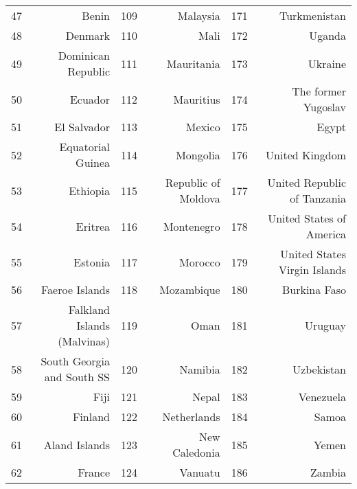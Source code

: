 \begin{table}[ht]
\begin{tabular}{r|r|r|r|r|r|}
47 & Benin & 109 & Malaysia & 171 & Turkmenistan \\ 
48 & Denmark & 110 & Mali & 172 & Uganda \\ 
49 & Dominican Republic & 111 & Mauritania & 173 & Ukraine \\ 
50 & Ecuador & 112 & Mauritius & 174 & The former Yugoslav \\ 
51 & El Salvador & 113 & Mexico & 175 & Egypt \\ 
52 & Equatorial Guinea & 114 & Mongolia & 176 & United Kingdom \\ 
53 & Ethiopia & 115 & Republic of Moldova & 177 & United Republic of Tanzania \\ 
54 & Eritrea & 116 & Montenegro & 178 & United States of America \\ 
55 & Estonia & 117 & Morocco & 179 & United States Virgin Islands \\ 
56 & Faeroe Islands & 118 & Mozambique & 180 & Burkina Faso \\ 
57 & Falkland Islands (Malvinas) & 119 & Oman & 181 & Uruguay \\ 
58 & South Georgia and South SS & 120 & Namibia & 182 & Uzbekistan \\ 
59 & Fiji & 121 & Nepal & 183 & Venezuela \\ 
60 & Finland & 122 & Netherlands & 184 & Samoa \\ 
61 & Aland Islands & 123 & New Caledonia & 185 & Yemen \\ 
62 & France & 124 & Vanuatu & 186 & Zambia \\ 
\hline 
\end{tabular}
\end{table}







\newpage
